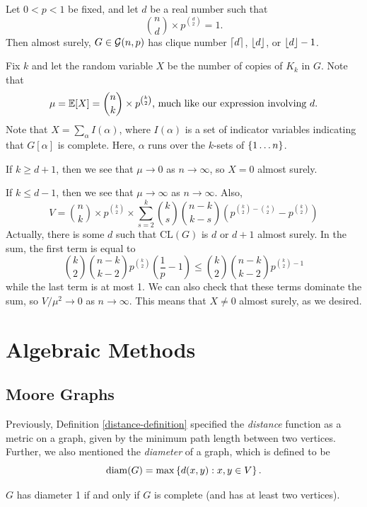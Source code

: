 \documentclass{article}
\begin{document}
\begin{proposition}
    Let $0 < p < 1$ be fixed, and let $d$ be a real number such that
    \[
	\binom n d \times p^{\binom d 2} = 1.
	\]
	Then almost surely, $G \in \mathcal{G} (n, p)$ has clique number $\left\lceil d\right\rceil$, $\left\lfloor d\right\rfloor$, or $\left\lfloor d\right\rfloor - 1$.
\end{proposition}

\begin{prf}
    Fix $k$ and let the random variable $X$ be the number of copies of $K_k$ in $G$. Note that
    \[
	\mu = \mathbb{E}[X] = \binom n k \times p^{\binom k 2} \text{, much like our expression involving $d$.}
	\]
	Note that $X = \sum_\alpha I(\alpha)$, where $I(\alpha)$ is a set of indicator variables indicating that $G[\alpha]$ is complete. Here, $\alpha$ runs over the $k$-sets of $\left\lbrace 1 \dots n \right\rbrace$.
	
	If $k \geq d+1$, then we see that $\mu \to 0$ as $n \to \infty$, so $X = 0$ almost surely.
	
	If $k \leq d-1$, then we see that $\mu \to \infty$ as $n \to \infty$. Also,
	\[
	V = \binom n k \times p^{\binom k 2} \times \sum_{s=2}^k \binom k s \binom{n-k}{k-s} \left( p^{\binom k 2 - \binom s 2} - p^{\binom k 2} \right)
	\]
	Actually, there is some $d$ such that $\mathrm{CL}(G)$ is $d$ or $d+1$ almost surely. In the sum, the first term is equal to
	\[
	\binom k 2 \binom{n-k}{k-2} p^{\binom k 2} \left( \frac{1}{p} - 1 \right) \leq \binom k 2 \binom{n-k}{k-2} p^{\binom k 2 - 1}
	\]
	while the last term is at most 1. We can also check that these terms dominate the sum, so $V / \mu^2 \to 0$ as $n \to \infty$. This means that $X \neq 0$ almost surely, as we desired. 
\end{prf}


\pagebreak
\section{Algebraic Methods}
\subsection{Moore Graphs}

Previously, Definition \ref{distance-definition} specified the \textit{distance} function as a metric on a graph, given by the minimum path length between two vertices. Further, we also mentioned the \textit{diameter} of a graph, which is defined to be
\[
\mathrm{diam}(G) = \max \left\lbrace d(x, y) : x, y \in V \right\rbrace.
\]
\begin{corollary}
	$G$ has diameter 1 if and only if $G$ is complete (and has at least two vertices).
\end{corollary}
\end{document}
